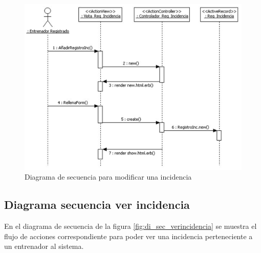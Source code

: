 		  \begin{figure}[H]
			  \centering
			    \includegraphics[width=15cm]{./eps/di_diagsecuencia/RegistroInc_Anadir.eps}
			  \caption{Diagrama de secuencia para modificar una incidencia}
			  \label{fig:di_sec_anadirincidencia}
			\end{figure}
			
			\newpage
		
		\subsection{Diagrama secuencia ver incidencia} %
		  \label{sub:diagrama_secuencia_ver_incidencia}
		
		  En el diagrama de secuencia de la figura \ref{fig:di_sec_verincidencia} se muestra el flujo de acciones correspondiente para poder ver una incidencia perteneciente a un entrenador al sistema.
		  
